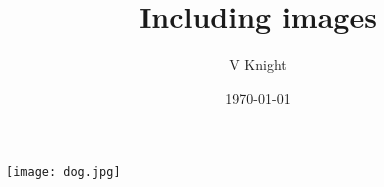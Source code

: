 \documentclass{article}
\title{Including images}
\author{V Knight}
\date{\today}
\begin{document}
\maketitle

\begin{center}
    \texttt{[image: dog.jpg]}
\end{center}
\end{document}
